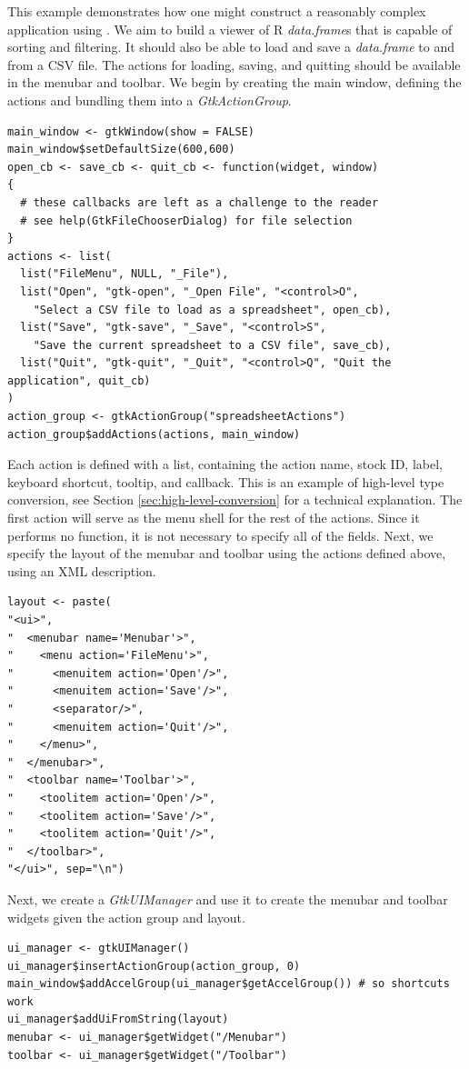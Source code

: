 \documentclass[article]{jss}
\begin{document}
This example demonstrates how one might construct a reasonably complex
application using . We aim to build a viewer of R \emph{data.frame}s that
is capable of sorting and filtering. It should also be able to load and save
a \emph{data.frame} to and from a CSV file. The actions for loading, saving, and quitting
should be available in the menubar and toolbar. We begin by creating the
main window, defining the actions and bundling them into a \emph{GtkActionGroup}.
\begin{verbatim}
main_window <- gtkWindow(show = FALSE)
main_window$setDefaultSize(600,600)
open_cb <- save_cb <- quit_cb <- function(widget, window) 
{
  # these callbacks are left as a challenge to the reader
  # see help(GtkFileChooserDialog) for file selection
}
actions <- list(
  list("FileMenu", NULL, "_File"), 
  list("Open", "gtk-open", "_Open File", "<control>O", 
    "Select a CSV file to load as a spreadsheet", open_cb),
  list("Save", "gtk-save", "_Save", "<control>S", 
    "Save the current spreadsheet to a CSV file", save_cb),
  list("Quit", "gtk-quit", "_Quit", "<control>Q", "Quit the application", quit_cb)
)
action_group <- gtkActionGroup("spreadsheetActions")
action_group$addActions(actions, main_window)
\end{verbatim}
Each action is defined with a list, containing the action name, stock ID,
label, keyboard shortcut, tooltip, and callback. This is an example of 
high-level type conversion, see Section \ref{sec:high-level-conversion} for
a technical explanation. The first action will serve as 
the menu shell for the rest of the actions. Since it performs no
function, it is not necessary to specify all of the fields. Next, we specify
the layout of the menubar and toolbar using the actions defined above, using
an XML description.
\begin{verbatim}
layout <- paste(
"<ui>",
"  <menubar name='Menubar'>",
"    <menu action='FileMenu'>",
"      <menuitem action='Open'/>",
"      <menuitem action='Save'/>",
"      <separator/>",
"      <menuitem action='Quit'/>",
"    </menu>",
"  </menubar>",
"  <toolbar name='Toolbar'>",
"    <toolitem action='Open'/>",
"    <toolitem action='Save'/>",
"    <toolitem action='Quit'/>",
"  </toolbar>",
"</ui>", sep="\n")
\end{verbatim}
Next, we create a \emph{GtkUIManager} and use it to create the menubar and
toolbar widgets given the action group and layout.
\begin{verbatim}
ui_manager <- gtkUIManager()
ui_manager$insertActionGroup(action_group, 0)
main_window$addAccelGroup(ui_manager$getAccelGroup()) # so shortcuts work
ui_manager$addUiFromString(layout)
menubar <- ui_manager$getWidget("/Menubar")
toolbar <- ui_manager$getWidget("/Toolbar")
\end{verbatim}
\end{document}
